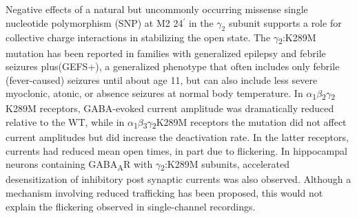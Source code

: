 \documentclass[journal=jacsat,manuscript=article]{achemso}
\newcommand{\GABAA}{GABA\textsubscript{A}R\xspace}
\newcommand{\fivering}{interfacial band~}
\newcommand{\WT}{WT\xspace}
\begin{document}
Negative effects of a natural but uncommonly occurring missense single nucleotide polymorphism (SNP) at M2 24$^{\prime}$ in the $\gamma_{2}$ subunit supports a role for collective charge interactions in stabilizing the open state.  
The \(\gamma\)\textsubscript{2}:K289M mutation has been reported in families with generalized epilepsy and febrile seizures plus(GEFS+)\cite{Mac2010,Baulac2001,Bianchi2002}, a generalized phenotype that often includes only febrile (fever-caused) seizures until about age 11, but can also include less severe myoclonic, atonic, or absence seizures at normal body temperature. In \(\alpha\)\textsubscript{1}\(\beta\)\textsubscript{2}\(\gamma\)\textsubscript{2} K289M receptors, GABA-evoked current amplitude was dramatically reduced relative to the \WT \cite{Baulac2001,Ramakrishnan2004}, while in \(\alpha\)\textsubscript{1}\(\beta\)\textsubscript{3}\(\gamma\)\textsubscript{2}K289M receptors the mutation did not affect current amplitudes but did increase the deactivation rate\cite{Eugene2007}. In the latter receptors, currents had reduced mean open times, in part due to flickering\cite{Bianchi2002,Macdonald2006,Hales2006}. In hippocampal neurons containing \GABAA with \(\gamma\)\textsubscript{2}:K289M subunits, %
accelerated desensitization of inhibitory post synaptic currents was also observed\cite{Eugene2007}.  Although a mechanism involving reduced trafficking has been proposed,\cite{Kang2006} this would not explain the flickering observed in single-channel recordings.\cite{Bianchi2002}  

\end{document}
